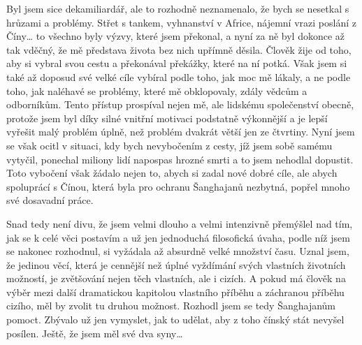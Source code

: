  Byl jsem sice dekamiliardář, ale to rozhodně neznamenalo, že bych se nesetkal s hrůzami a problémy. Střet s tankem, vyhnanství v Africe, nájemní vrazi poslání z Číny… to všechno byly výzvy, které jsem překonal, a nyní za ně byl dokonce až tak vděčný, že mě představa života bez nich upřímně děsila. Člověk žije od toho, aby si vybral svou cestu a překonával překážky, které na ní potká. Však jsem si také až doposud své velké cíle vybíral podle toho, jak moc mě lákaly, a ne podle toho, jak naléhavé se problémy, které mě obklopovaly, zdály vědcům a odborníkům. Tento přístup prospíval nejen mě, ale lidskému společenství obecně, protože jsem byl díky silné vnitřní motivaci podstatně výkonnější a je lepší vyřešit malý problém úplně, než problém dvakrát větší jen ze čtvrtiny. Nyní jsem se však ocitl v situaci, kdy bych nevybočením z cesty, jíž jsem sobě samému vytyčil, ponechal miliony lidí napospas hrozné smrti a to jsem nehodlal dopustit. Toto vybočení však žádalo nejen to, abych si zadal nové dobré cíle, ale abych spoluprácí s Čínou, která byla pro ochranu Šanghajanů nezbytná, popřel mnoho své dosavadní práce.  
 
 Snad tedy není divu, že jsem velmi dlouho a velmi intenzivně přemýšlel nad tím, jak se k celé věci postavím a už jen jednoduchá filosofická úvaha, podle níž jsem se nakonec rozhodnul, si vyžádala až absurdně velké množství času. Uznal jsem, že jedinou věcí, která je cennější než úplné vyždímání svých vlastních životních možností, je zvětšování nejen těch vlastních, ale i cizích. A pokud má člověk na výběr mezi další dramatickou kapitolou vlastního příběhu a záchranou příběhu cizího, měl by zvolit tu druhou možnost. Rozhodl jsem se tedy Šanghajanům pomoct. Zbývalo už jen vymyslet, jak to udělat, aby z toho čínský stát nevyšel posílen. Ještě, že jsem měl své dva syny… 
